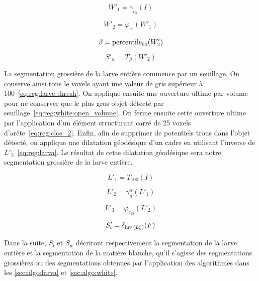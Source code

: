 \documentclass[\main/main.tex]{subfiles}
\begin{document}
\begin{equation}
    \label{eq:reg:open_1}
    W'_{1} = \gamma_{c_5}(I)
\end{equation}

\begin{equation}
    \label{eq:reg:clos_1}
    W'_{2} = \varphi_{c_5}(W'_1)
\end{equation}

\begin{equation}
    \label{eq:reg:decile}
    \beta = \operatorname{\textnormal{percentile}}_{90}(W'_2)
\end{equation}

\begin{equation}
    \label{eq:reg:white}
    S'_w = T_{\beta}(W'_2)
\end{equation}

%
La segmentation grossière de la larve entière commence par un seuillage.
%
On conserve ainsi tous le voxels ayant une valeur de gris supérieur à 100~\eqref{eq:reg:larve:thresh}.
%
On applique ensuite une ouverture ultime par volume pour ne conserver que le plus gros objet détecté par seuillage~\eqref{eq:reg:white:open_volume}.
%
On ferme ensuite cette ouverture ultime par l'application d'un élément structurant carré de 25 voxels d'arête~\eqref{eq:reg:clos_2}.
%
Enfin, afin de supprimer de potentiels trous dans l'objet détecté, on applique une dilatation géodésique d'un cadre en utilisant l'inverse de $L'_3$~\eqref{eq:reg:larva}.
%
Le résultat de cette dilatation géodésique sera notre segmentation grossière de la larve entière.

\begin{equation}
    \label{eq:reg:larve:thresh}
    L'_{1} = T_{100}(I)
\end{equation}

\begin{equation}
\label{eq:reg:white:open_volume}
    L'_{2} = \gamma^{\alpha}_{u}(L'_1)
\end{equation}

\begin{equation}
    \label{eq:reg:clos_2}
    L'_{3} = \varphi_{c_25}(L'_2)
\end{equation}

\begin{equation}
    \label{eq:reg:larva}
    S'_l = \delta_{\operatorname{\textnormal{inv}}{}(L'_3)}(F)
\end{equation}

%
Dans la suite, $S_l$ et $S_w$ décriront respectivement la segmentation de la larve entière et la segmentation de la matière blanche, qu'il s'agisse des segmentations grossières ou des segmentations obtenues par l'application des algorithmes dans les \autoref{sec:algo:larva} et \autoref{sec:algo:white}.
\end{document}
